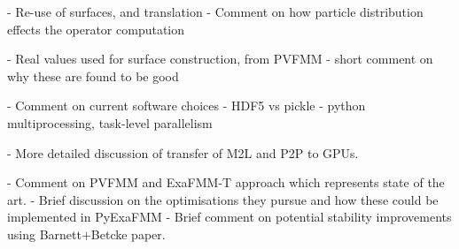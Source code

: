 - Re-use of surfaces, and translation
    - Comment on how particle distribution effects the operator computation

- Real values used for surface construction, from PVFMM
    - short comment on why these are found to be good

- Comment on current software choices
    - HDF5 vs pickle
    - python multiprocessing, task-level parallelism

- More detailed discussion of transfer of M2L and P2P to GPUs.

- Comment on PVFMM and ExaFMM-T approach which represents state of the art.
    - Brief discussion on the optimisations they pursue and how these could
    be implemented in PyExaFMM
    - Brief comment on potential stability improvements using Barnett+Betcke
    paper.
